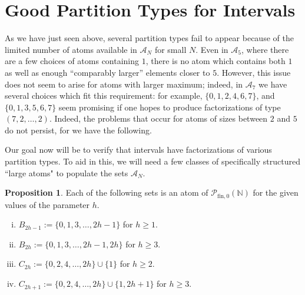 \documentclass{report}
\newcommand{\NN}{\mathbb{N}}
\renewcommand{\P}{\mathcal{P}}
\newcommand{\fin}{\textrm{fin}}
\renewcommand{\:}{\text{:}}
\newcommand{\PN}{{\P_{\fin,0}(\NN)}}
\theoremstyle{definition}
\newtheorem{prop}[defn]{Proposition}
\begin{document}
\section{Good Partition Types for Intervals}

As we have just seen above, several partition types fail to appear because of the limited number of atoms available in $\mathcal{A}_N$ for small $N$.
Even in $\mathcal{A}_5$, where there are a few choices of atoms containing $1$, there is no atom which contains both $1$ as well as enough ``comparably larger'' elements closer to $5$.
However, this issue does not seem to arise for atoms with larger maximum; indeed, in $\mathcal{A}_7$ we have several choices which fit this requirement: for example, $\{0, 1, 2, 4, 6, 7\}$, and $\{0, 1, 3, 5, 6, 7\}$ seem promising if one hopes to produce factorizations of type $(7,2,\dots, 2)$. 
Indeed, the problems that occur for atoms of sizes between $2$ and $5$ do not persist, for we have the following.

Our goal now will be to verify that intervals have factorizations of various partition types.  
To aid in this, we will need a few classes of specifically structured ``large atoms" to populate the sets $\mathcal{A}_N$.

\begin{prop} \label{prop:2-congruence atoms}
Each of the following sets is an atom of $\PN$ for the given values of the parameter $h$.
\begin{enumerate}[(i)]
\item $B_{2h-1} := \{0,1,3,\dots, 2h-1\}$ for $h\ge 1$.
\item $B_{2h} := \{0,1,3,\dots, 2h-1,2h\}$ for $h \ge 3$.
\item $C_{2h} := \{0,2,4,\dots,2h\}\cup\{1\}$ for $h\ge 2$.
\item $C_{2h+1} := \{0,2,4,\dots, 2h\}\cup\{1,2h+1\}$ for $h\ge 3$.
\end{enumerate}
\end{prop}
\end{document}
